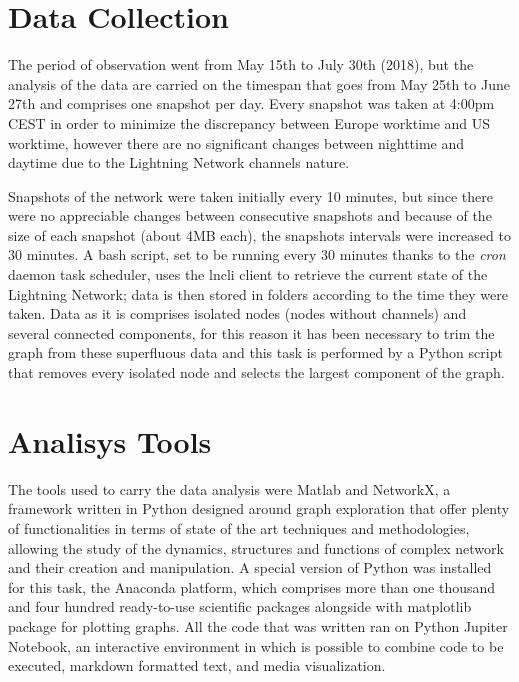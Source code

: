 	\section{Data Collection}
	
	The period of observation went from May 15th to July 30th (2018), but the analysis of the data are carried on the timespan that goes from May 25th to June 27th and comprises one snapshot per day. Every snapshot was taken at 4:00pm CEST in order to minimize the discrepancy between Europe worktime and US worktime, however there are no significant changes between nighttime and daytime due to the Lightning Network channels nature. 
	
	Snapshots of the network were taken initially every 10 minutes, but since there were no appreciable changes between consecutive snapshots and because of the size of each snapshot (about 4MB each), the snapshots intervals were increased to 30 minutes. A bash script, set to be running every 30 minutes thanks to the \textit{cron} daemon task scheduler, uses the lncli client to retrieve the current state of the Lightning Network; data is then stored in folders according to the time they were taken. 
	Data as it is comprises isolated nodes (nodes without channels) and several connected components, for this reason it has been necessary to trim the graph from these superfluous data and this task is performed by a Python script that removes every isolated node and selects the largest component of the graph.
	
	\section{Analisys Tools}
	
	The tools used to carry the data analysis were Matlab and NetworkX, a framework written in Python designed around graph exploration that offer plenty of functionalities in terms of state of the art techniques and methodologies, allowing the study of the dynamics, structures and functions of complex network and their creation and manipulation. A special version of Python was installed for this task, the Anaconda platform, which comprises more than one thousand and four hundred ready-to-use scientific packages alongside with matplotlib package for plotting graphs. All the code that was written ran on Python Jupiter Notebook, an interactive environment in which is possible to combine code to be executed, markdown formatted text, and media visualization.
